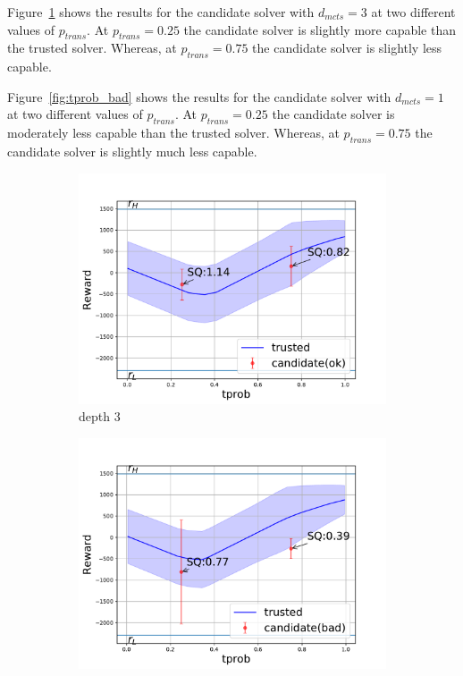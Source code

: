Figure~\ref{fig:tprob_ok} shows the results for the candidate solver with $d_{mcts}=3$ at two different values of $p_{trans}$. At $p_{trans}=0.25$ the candidate solver is slightly more capable than the trusted solver. Whereas, at $p_{trans}=0.75$ the candidate solver is slightly less capable.

Figure~\ref{fig:tprob_bad} shows the results for the candidate solver with $d_{mcts}=1$ at two different values of $p_{trans}$. At $p_{trans}=0.25$ the candidate solver is moderately less capable than the trusted solver. Whereas, at $p_{trans}=0.75$ the candidate solver is slightly much less capable.

\begin{figure}[tbp]
    \centering
    \begin{subfigure}[b]{0.48\linewidth}
        \centering
        \includegraphics[width=1.0\linewidth]{Figures/transition_vary_tprob_ok.pdf}
        \vfill
        \caption{\solve{} depth 3}
        \label{fig:tprob_ok}
    \end{subfigure}%
    \hfill
    \begin{subfigure}[b]{0.48\linewidth}
        \centering
        \includegraphics[width=1.0\linewidth]{Figures/transition_vary_tprob_bad.pdf}

\end{subfigure}
\end{figure}
